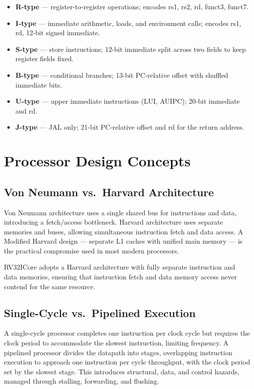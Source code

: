 \begin{itemize}
	\item \textbf{R-type} — register-to-register operations; encodes rs1, rs2, rd, funct3, funct7.
	\item \textbf{I-type} — immediate arithmetic, loads, and environment calls; encodes rs1, rd, 12-bit signed immediate.
	\item \textbf{S-type} — store instructions; 12-bit immediate split across two fields to keep register fields fixed.
	\item \textbf{B-type} — conditional branches; 13-bit PC-relative offset with shuffled immediate bits.
	\item \textbf{U-type} — upper immediate instructions (LUI, AUIPC); 20-bit immediate and rd.
	\item \textbf{J-type} — JAL only; 21-bit PC-relative offset and rd for the return address.
\end{itemize}

\section{Processor Design Concepts}
\subsection{Von Neumann vs.\ Harvard Architecture}
Von Neumann architecture uses a single shared bus for instructions and data, introducing a fetch/access bottleneck. Harvard architecture uses separate memories and buses, allowing simultaneous instruction fetch and data access. A Modified Harvard design — separate L1 caches with unified main memory — is the practical compromise used in most modern processors.

RV32ICore adopts a Harvard architecture with fully separate instruction and data memories, ensuring that instruction fetch and data memory access never contend for the same resource.

\subsection{Single-Cycle vs.\ Pipelined Execution}
A single-cycle processor completes one instruction per clock cycle but requires the clock period to accommodate the slowest instruction, limiting frequency. A pipelined processor divides the datapath into stages, overlapping instruction execution to approach one instruction per cycle throughput, with the clock period set by the slowest stage. This introduces structural, data, and control hazards, managed through stalling, forwarding, and flushing.

